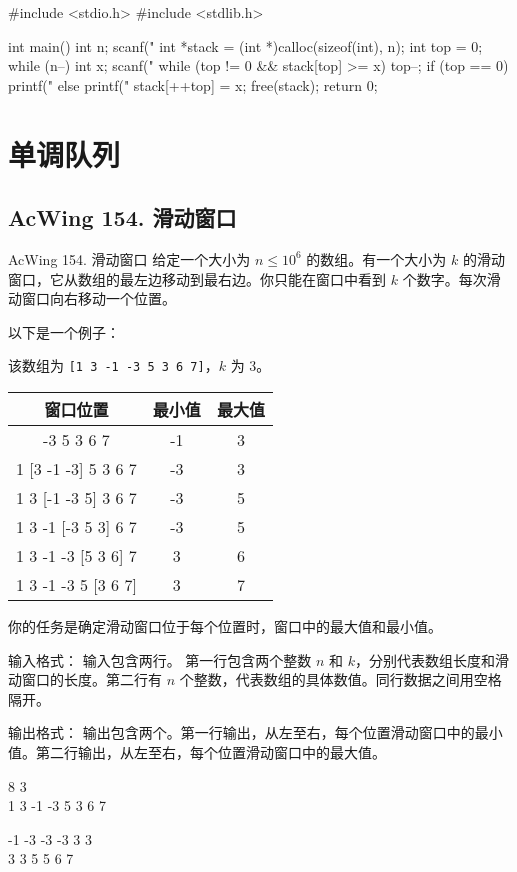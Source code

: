 \begin{mycpptwocol}[单调栈]
#include <stdio.h>
#include <stdlib.h>

int main()
{
    int n;
    scanf("%
    int *stack = (int *)calloc(sizeof(int), n);
    int top = 0;
    while (n--) {
        int x;
        scanf("%
        while (top != 0 && stack[top] >= x) {
            top--;
        }
        if (top == 0) {
            printf("%
        } else {
            printf("%
        }
        stack[++top] = x;
    }
    free(stack);
    return 0;
}
\end{mycpptwocol}

\section{单调队列}
\subsection{AcWing 154. 滑动窗口}

\begin{titledbox}{AcWing 154. 滑动窗口}
给定一个大小为 $n \le 10^6$ 的数组。有一个大小为 $k$ 的滑动窗口，它从数组的最左边移动到最右边。你只能在窗口中看到 $k$ 个数字。每次滑动窗口向右移动一个位置。

以下是一个例子：

该数组为 \lstinline{[1 3 -1 -3 5 3 6 7]}，$k$ 为 $3$。

\begin{tabular}{|c|c|c|}
    \hline
        窗口位置 & 最小值 & 最大值 \\ \hline
        [1  3  -1] -3  5  3  6  7 & -1 & 3 \\ \hline
        1 [3  -1  -3] 5  3  6  7 & -3 & 3 \\ \hline
        1  3 [-1  -3  5] 3  6  7 & -3 & 5 \\ \hline
        1  3  -1 [-3  5  3] 6  7 & -3 & 5 \\ \hline
        1  3  -1  -3 [5  3  6] 7 & 3 & 6 \\ \hline
        1  3  -1  -3  5 [3  6  7] & 3 & 7 \\ \hline
\end{tabular}

你的任务是确定滑动窗口位于每个位置时，窗口中的最大值和最小值。

输入格式：
输入包含两行。 第一行包含两个整数 $n$ 和 $k$，分别代表数组长度和滑动窗口的长度。第二行有 $n$ 个整数，代表数组的具体数值。同行数据之间用空格隔开。

输出格式：
输出包含两个。第一行输出，从左至右，每个位置滑动窗口中的最小值。第二行输出，从左至右，每个位置滑动窗口中的最大值。
    
\begin{inputblock}
    8 3 \\
    1 3 -1 -3 5 3 6 7
\end{inputblock}
\begin{outputblock}
    -1 -3 -3 -3 3 3 \\
    3 3 5 5 6 7
\end{outputblock}
    
\end{titledbox}


